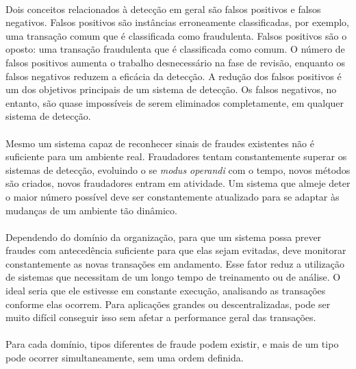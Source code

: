 \documentclass{iiufrgs}
\begin{document}
\paragraph{}Dois conceitos relacionados à detecção em geral são falsos positivos e falsos negativos. Falsos positivos são instâncias erroneamente classificadas, por exemplo, uma transação comum que é classificada como fraudulenta. Falsos positivos são o oposto: uma transação fraudulenta que é classificada como comum. O número de falsos positivos aumenta o trabalho desnecessário na fase de revisão, enquanto os falsos negativos reduzem a eficácia da detecção. A redução dos falsos positivos é um dos objetivos principais de um sistema de detecção. Os falsos negativos, no entanto, são quase impossíveis de serem eliminados completamente, em qualquer sistema de detecção.

\paragraph{}Mesmo um sistema capaz de reconhecer sinais de fraudes existentes não é suficiente para um ambiente real. Fraudadores tentam constantemente superar os sistemas de detecção, evoluindo o se \emph{modus operandi} com o tempo, novos métodos são criados, novos fraudadores entram em atividade. Um sistema que almeje deter o maior número possível deve ser constantemente atualizado para se adaptar às mudanças de um ambiente tão dinâmico.

\paragraph{}Dependendo do domínio da organização, para que um sistema possa prever fraudes com antecedência suficiente para que elas sejam evitadas, deve monitorar constantemente as novas transações em andamento. Esse fator reduz a utilização de sistemas que necessitam de um longo tempo de treinamento ou de análise. O ideal seria que ele estivesse em constante execução, analisando as transações conforme elas ocorrem. Para aplicações grandes ou descentralizadas, pode ser muito difícil conseguir isso sem afetar a performance geral das transações.

\paragraph{}Para cada domínio, tipos diferentes de fraude podem existir, e mais de um tipo pode ocorrer simultaneamente, sem uma ordem definida. 
\end{document}
